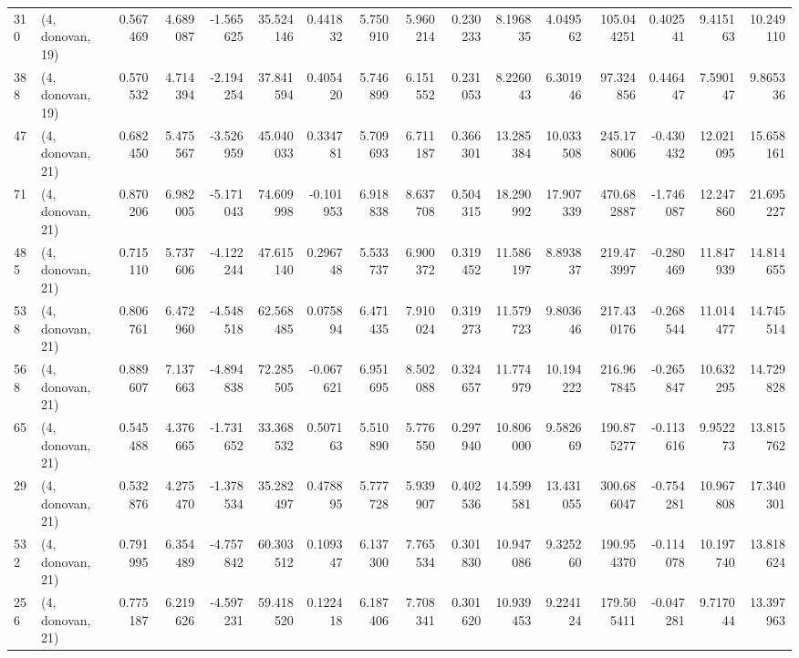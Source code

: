 \begin{tabular}{llrrrrrrrrrrrrrr}
310 &  (4, donovan, 19) &   0.567469 &   4.689087 &  -1.565625 &    35.524146 &   0.441832 &   5.750910 &   5.960214 &  0.230233 &   8.196835 &   4.049562 &   105.044251 &  0.402541 &   9.415163 &  10.249110 \\
388 &  (4, donovan, 19) &   0.570532 &   4.714394 &  -2.194254 &    37.841594 &   0.405420 &   5.746899 &   6.151552 &  0.231053 &   8.226043 &   6.301946 &    97.324856 &  0.446447 &   7.590147 &   9.865336 \\
47  &  (4, donovan, 21) &   0.682450 &   5.475567 &  -3.526959 &    45.040033 &   0.334781 &   5.709693 &   6.711187 &  0.366301 &  13.285384 &  10.033508 &   245.178006 & -0.430432 &  12.021095 &  15.658161 \\
71  &  (4, donovan, 21) &   0.870206 &   6.982005 &  -5.171043 &    74.609998 &  -0.101953 &   6.918838 &   8.637708 &  0.504315 &  18.290992 &  17.907339 &   470.682887 & -1.746087 &  12.247860 &  21.695227 \\
485 &  (4, donovan, 21) &   0.715110 &   5.737606 &  -4.122244 &    47.615140 &   0.296748 &   5.533737 &   6.900372 &  0.319452 &  11.586197 &   8.893837 &   219.473997 & -0.280469 &  11.847939 &  14.814655 \\
538 &  (4, donovan, 21) &   0.806761 &   6.472960 &  -4.548518 &    62.568485 &   0.075894 &   6.471435 &   7.910024 &  0.319273 &  11.579723 &   9.803646 &   217.430176 & -0.268544 &  11.014477 &  14.745514 \\
568 &  (4, donovan, 21) &   0.889607 &   7.137663 &  -4.894838 &    72.285505 &  -0.067621 &   6.951695 &   8.502088 &  0.324657 &  11.774979 &  10.194222 &   216.967845 & -0.265847 &  10.632295 &  14.729828 \\
65  &  (4, donovan, 21) &   0.545488 &   4.376665 &  -1.731652 &    33.368532 &   0.507163 &   5.510890 &   5.776550 &  0.297940 &  10.806000 &   9.582669 &   190.875277 & -0.113616 &   9.952273 &  13.815762 \\
29  &  (4, donovan, 21) &   0.532876 &   4.275470 &  -1.378534 &    35.282497 &   0.478895 &   5.777728 &   5.939907 &  0.402536 &  14.599581 &  13.431055 &   300.686047 & -0.754281 &  10.967808 &  17.340301 \\
532 &  (4, donovan, 21) &   0.791995 &   6.354489 &  -4.757842 &    60.303512 &   0.109347 &   6.137300 &   7.765534 &  0.301830 &  10.947086 &   9.325260 &   190.954370 & -0.114078 &  10.197740 &  13.818624 \\
256 &  (4, donovan, 21) &   0.775187 &   6.219626 &  -4.597231 &    59.418520 &   0.122418 &   6.187406 &   7.708341 &  0.301620 &  10.939453 &   9.224124 &   179.505411 & -0.047281 &   9.717044 &  13.397963 \\

\end{tabular}
